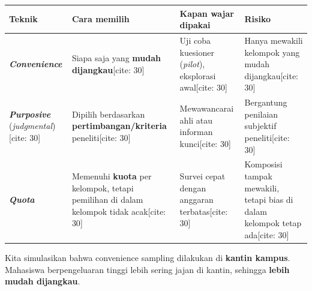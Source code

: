 \documentclass[
  indonesian,
  letterpaper,
]{book}
\newenvironment{Shaded}{\begin{snugshade}}{\end{snugshade}}
\newcommand{\CommentTok}[1]{\textcolor[rgb]{0.37,0.37,0.37}{#1}}
\newcommand{\DecValTok}[1]{\textcolor[rgb]{0.68,0.00,0.00}{#1}}
\newcommand{\FloatTok}[1]{\textcolor[rgb]{0.68,0.00,0.00}{#1}}
\newcommand{\FunctionTok}[1]{\textcolor[rgb]{0.28,0.35,0.67}{#1}}
\newcommand{\NormalTok}[1]{\textcolor[rgb]{0.00,0.23,0.31}{#1}}
\newcommand{\OtherTok}[1]{\textcolor[rgb]{0.00,0.23,0.31}{#1}}
\newcommand{\SpecialCharTok}[1]{\textcolor[rgb]{0.37,0.37,0.37}{#1}}
\newcounter{none} %
\begin{document}
{\def\LTcaptype{none} %
\begin{longtable}[]{@{}
  >{\raggedright\arraybackslash}p{}
  >{\raggedright\arraybackslash}p{}
  >{\raggedright\arraybackslash}p{}
  >{\raggedright\arraybackslash}p{}@{}}
\toprule\noalign{}
\begin{minipage}[b]{\linewidth}\raggedright
Teknik
\end{minipage} & \begin{minipage}[b]{\linewidth}\raggedright
Cara memilih
\end{minipage} & \begin{minipage}[b]{\linewidth}\raggedright
Kapan wajar dipakai
\end{minipage} & \begin{minipage}[b]{\linewidth}\raggedright
Risiko
\end{minipage} \\
\midrule\noalign{}
\endhead
\bottomrule\noalign{}
\endlastfoot
\textbf{\emph{Convenience}} & Siapa saja yang \textbf{mudah
dijangkau}{[}cite: 30{]} & Uji coba kuesioner (\emph{pilot}), eksplorasi
awal{[}cite: 30{]} & Hanya mewakili kelompok yang mudah
dijangkau{[}cite: 30{]} \\
\textbf{\emph{Purposive}} (\emph{judgmental}){[}cite: 30{]} & Dipilih
berdasarkan \textbf{pertimbangan/kriteria} peneliti{[}cite: 30{]} &
Mewawancarai ahli atau informan kunci{[}cite: 30{]} & Bergantung
penilaian subjektif peneliti{[}cite: 30{]} \\
\textbf{\emph{Quota}} & Memenuhi \textbf{kuota} per kelompok, tetapi
pemilihan di dalam kelompok tidak acak{[}cite: 30{]} & Survei cepat
dengan anggaran terbatas{[}cite: 30{]} & Komposisi tampak mewakili,
tetapi bias di dalam kelompok tetap ada{[}cite: 30{]} \\
\end{longtable}
}

Kita simulasikan bahwa convenience sampling dilakukan di \textbf{kantin
kampus}. Mahasiswa berpengeluaran tinggi lebih sering jajan di kantin,
sehingga \textbf{lebih mudah dijangkau}.

\begin{Shaded}
\end{Shaded}
\end{document}
